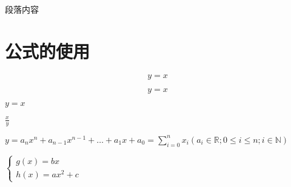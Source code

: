 \documentclass{article}
\begin{document}
\begin{CJK}{UTF8}{gkai}

\title{}%
\date{}
\author{张舒悦}
\maketitle

\section{}%
段落内容
\subsection{}%



\section{公式的使用}
\begin{equation}%
y = x
\end{equation}

$$y = x$$%

$y = x$%

$\frac{x}{y}$%

$y = a_nx^n + a_{n-1}x^{n-1} + \ldots + a_1x + a_0 = \sum_{i=0}^{n}{x_i}(a_i \in \mathbb{R}; 0 \le i \le n; i \in \mathbb{N})$%

$\begin{cases}%
g(x) = bx\\
h(x) = ax^2 +  c
\end{cases}$



\end{CJK}
\end{document}
